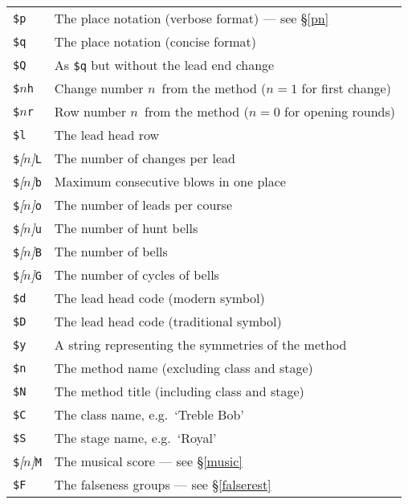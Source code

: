 \documentclass[a4paper,11pt,oneside]{book}
\makeatletter
\newcommand{\fspecd}[1]{\index{#1@{\hspace*{-\fspecwidth}\texttt{\$#1}}|ulink}}
\newcommand{\sref}[1]{\hyperref[#1]{\S\ref{#1}}}
\makeatother
\begin{document}
{\def\D{\texttt{\$}}\def\N{$n$\/}\def\No{\textit{[$n$]}\/}
\def\F#1{\texttt{#1}\fspecd{#1}}
\begin{tabularx}{\textwidth}{lX}
\D\F{p}&The place notation (verbose format) --- see \sref{pn}\\
\D\F{q}&The place notation (concise format)\\
\D\F{Q}&As \texttt{\$q} but without the lead end change%
  \index{place notation!printing|see{\texttt{\$p}, %
    \texttt{\$q} \textit{and} \texttt{\$Q}}}\\
\D\N\F{h}&Change number \N\ from the method ($n=1$ for first change)%
  \index{changes, printing|see{\texttt{\$h}}}\\
\D\N\F{r}&Row number \N\ from the method ($n=0$ for opening rounds)%
  \index{rows, printing|see{\texttt{\$r}}}\\
\D\F{l}&The lead head row%
  \index{lead head!printing|see{\texttt{\$l}}}\\
\D\No\F{L}&The number of changes per lead%
  \index{lead length!printing|see{\texttt{\$L}}}\\
\D\No\F{b}&Maximum consecutive blows in one place%
  \index{blows, maximum consecutive!printing|see{\texttt{\$b}}}\\
\D\No\F{o}&The number of leads per course\\
\D\No\F{u}&The number of hunt bells\\
\D\No\F{B}&The number of bells\\
\D\No\F{G}&The number of cycles of bells\\
\D\F{d}&The lead head code (modern symbol)\\
\D\F{D}&The lead head code (traditional symbol)
  \index{lead head!code|see{\texttt{\$d} \textit{and} \texttt{\$D}}}\\
\D\F{y}&A string representing the symmetries of the method%
  \index{symmetry!printing|see{\texttt{\$y}}}\\
\D\F{n}&The method name (excluding class and stage)\\
\D\F{N}&The method title (including class and stage)\\
\D\F{C}&The class name, e.g.\ `Treble Bob'%
  \index{class!printing name|see{\texttt{\$C}}}\\
\D\F{S}&The stage name, e.g.\ `Royal'%
  \index{stage!printing name|see{\texttt{\$S}}}\\
\D\No\F{M}&The musical score --- see \sref{music}\\
\D\F{F}&The falseness groups --- see \sref{falserest}\\

\end{tabularx}}
\end{document}
